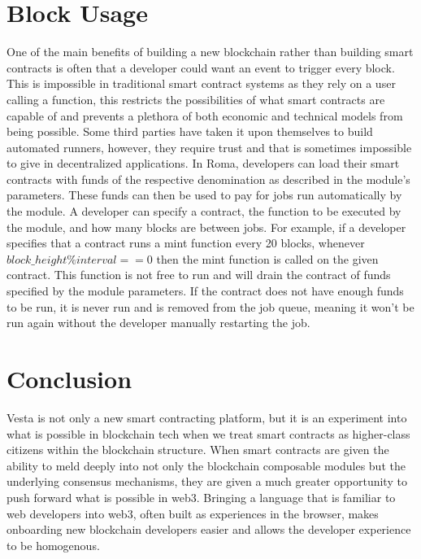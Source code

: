 \documentclass[a4paper]{article}
\begin{document}
\section{Block Usage}
One of the main benefits of building a new blockchain rather than building smart contracts is often that a developer could want an event to trigger every block. This is impossible in traditional smart contract systems as they rely on a user calling a function, this restricts the possibilities of what smart contracts are capable of and prevents a plethora of both economic and technical models from being possible. Some third parties have taken it upon themselves to build automated runners, however, they require trust and that is sometimes impossible to give in decentralized applications.\cite{croncat} In Roma, developers can load their smart contracts with funds of the respective denomination as described in the module's parameters. These funds can then be used to pay for jobs run automatically by the module. A developer can specify a contract, the function to be executed by the module, and how many blocks are between jobs. For example, if a developer specifies that a contract runs a mint function every 20 blocks, whenever $block\_height \% interval == 0$ then the mint function is called on the given contract. This function is not free to run and will drain the contract of funds specified by the module parameters. If the contract does not have enough funds to be run, it is never run and is removed from the job queue, meaning it won't be run again without the developer manually restarting the job.

\section{Conclusion}
Vesta is not only a new smart contracting platform, but it is an experiment into what is possible in blockchain tech when we treat smart contracts as higher-class citizens within the blockchain structure. When smart contracts are given the ability to meld deeply into not only the blockchain composable modules but the underlying consensus mechanisms, they are given a much greater opportunity to push forward what is possible in web3. Bringing a language that is familiar to web developers into web3, often built as experiences in the browser, makes onboarding new blockchain developers easier and allows the developer experience to be homogenous.

\newpage
\printbibliography
\end{document}
